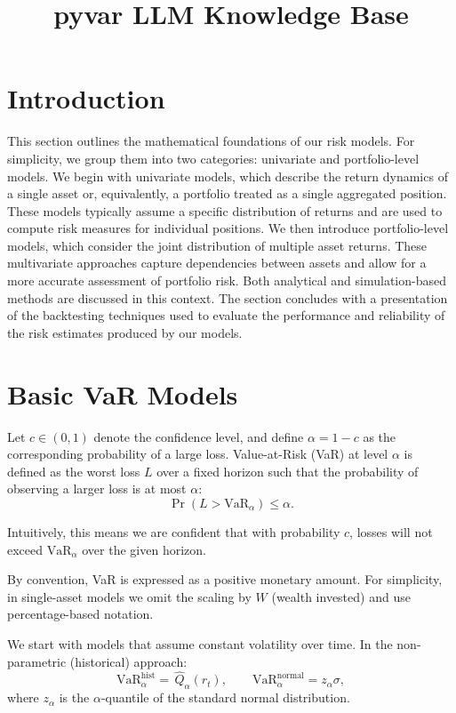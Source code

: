 \documentclass[12pt]{article}
\title{\textbf{pyvar LLM Knowledge Base}}
\author{}
\date{}
\begin{document}
\maketitle
\tableofcontents
\newpage

\section{Introduction}

This section outlines the mathematical foundations of our risk models. For simplicity, we group them into two categories: univariate and portfolio-level models. We begin with univariate models, which describe the return dynamics of a single asset or, equivalently, a portfolio treated as a single aggregated position. These models typically assume a specific distribution of returns and are used to compute risk measures for individual positions.
We then introduce portfolio-level models, which consider the joint distribution of multiple asset returns. These multivariate approaches capture dependencies between assets and allow for a more accurate assessment of portfolio risk. Both analytical and simulation-based methods are discussed in this context.
The section concludes with a presentation of the backtesting techniques used to evaluate the performance and reliability of the risk estimates produced by our models.


\section{Basic VaR Models}

Let \( c \in (0,1) \) denote the confidence level, and define \( \alpha = 1 - c \) as the corresponding probability of a large loss. Value-at-Risk (VaR) at level \( \alpha \) is defined as the worst loss \( L \) over a fixed horizon such that the probability of observing a larger loss is at most \( \alpha \):
\[
\Pr(L > \text{VaR}_\alpha) \le \alpha.
\]

Intuitively, this means we are confident that with probability \( c \), losses will not exceed \( \text{VaR}_\alpha \) over the given horizon.

By convention, VaR is expressed as a positive monetary amount. For simplicity, in single-asset models we omit the scaling by \( W \) (wealth invested) and use percentage-based notation.

We start with models that assume constant volatility over time. In the non-parametric (historical) approach:
\[
\mathrm{VaR}_{\alpha}^{\mathrm{hist}} =\,\widehat{Q}_{\alpha}(r_t), \qquad
\mathrm{VaR}_{\alpha}^{\mathrm{normal}} = z_{\alpha} \sigma,
\]
where \( z_\alpha \) is the \( \alpha \)-quantile of the standard normal distribution.
\end{document}
